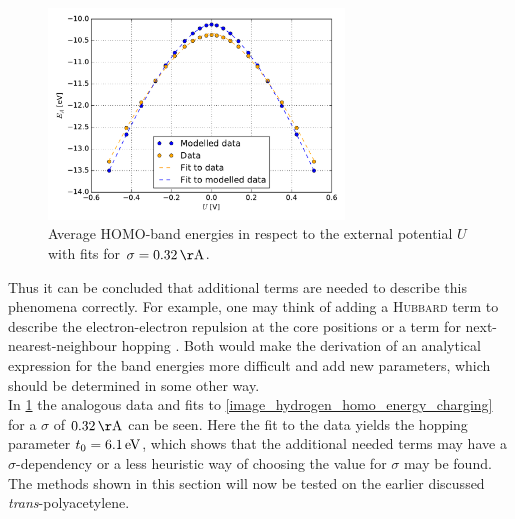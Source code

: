 \begin{figure}[]
	\centering
	\includegraphics[width = 0.7\textwidth]{Images/Hydrogen/charging/Homo_energy_charge_sigma_32}
	\caption{Average HOMO-band energies in respect to the external potential $U$ with fits for $\sigma = \unit[0.32]{\AA}$.}
	\label{image_hydrogen_homo_energy_charging_sigma_32}
\end{figure}
Thus it can be concluded that additional terms are needed to describe this phenomena correctly. For example, one may think of adding a \textsc{Hubbard} term to describe the electron-electron repulsion at the core positions or a term for next-nearest-neighbour hopping \cite{PhysRevLett.103.067004,PhysRevB.82.155141}. Both would make the derivation of an analytical expression for the band energies more difficult and add new parameters, which should be determined in some other way.\\ In \cref{image_hydrogen_homo_energy_charging_sigma_32} the analogous data and fits to \cref{image_hydrogen_homo_energy_charging} for a $\sigma$ of $\unit[0.32]{\AA}$ can be seen. Here the fit to the data yields the hopping parameter $t_0 = \unit[6.1]{eV}$, which shows that the additional needed terms may have a $\sigma$-dependency or a less heuristic way of choosing the value for $\sigma$ may be found.\\
The methods shown in this section will now be tested on the earlier discussed \emph{trans}-polyacetylene.
